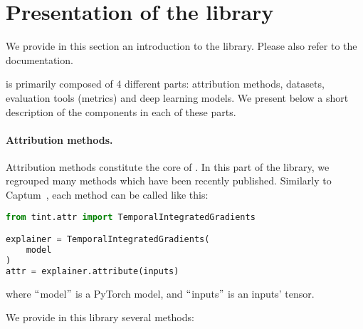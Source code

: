 \section{Presentation of the library}
\label{sec:presentation}

We provide in this section an introduction to the \texttt{} library.
Please also refer to the documentation.

\texttt{} is primarily composed of 4 different parts: attribution methods, datasets,
evaluation tools (metrics) and deep learning models.
We present below a short description of the components in each of these parts.


\paragraph{Attribution methods.}

Attribution methods constitute the core of \texttt{}.
In this part of the library, we regrouped many methods which have been recently published.
Similarly to Captum~\citep{kokhlikyan2020captum}, each method can be called like this:

\begin{lstlisting}[language=Python, caption=Attribution loading example, label={lst:attr}]
from tint.attr import TemporalIntegratedGradients

explainer = TemporalIntegratedGradients(
    model
)
attr = explainer.attribute(inputs)
\end{lstlisting}

where $``$model$"$ is a PyTorch model, and $``$inputs$"$ is an inputs' tensor.

We provide in this library several methods:

